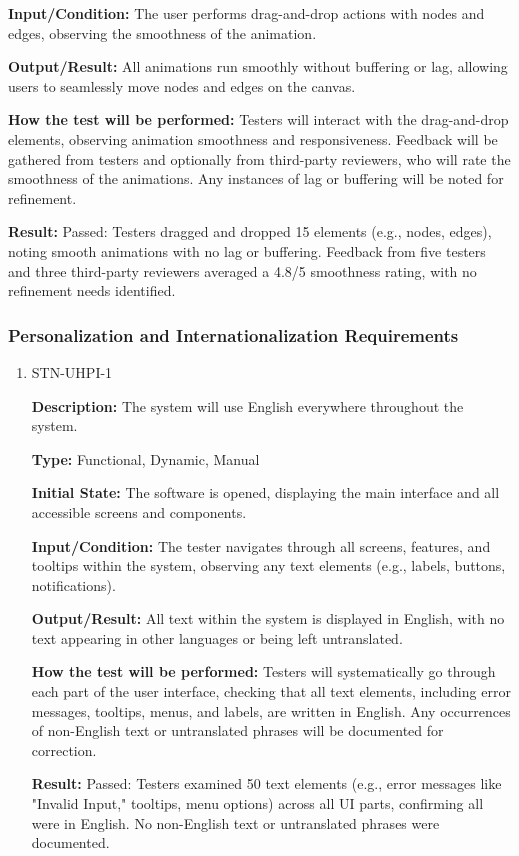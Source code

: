 \documentclass[12pt, titlepage]{article}
\begin{document}
\begin{enumerate}
\textbf{Input/Condition:} The user performs drag-and-drop actions with nodes and edges, observing the smoothness of the animation.

\textbf{Output/Result:} All animations run smoothly without buffering or lag, allowing users to seamlessly move nodes and edges on the canvas.

\textbf{How the test will be performed:} Testers will interact with the drag-and-drop elements, observing animation smoothness and responsiveness. Feedback will be gathered from testers and optionally from third-party reviewers, who will rate the smoothness of the animations. Any instances of lag or buffering will be noted for refinement.

\textbf{Result:} Passed: Testers dragged and dropped 15 elements (e.g., nodes, edges), noting smooth animations with no lag or buffering. Feedback from five testers and three third-party reviewers averaged a 4.8/5 smoothness rating, with no refinement needs identified.
\end{enumerate}

\subsubsection{Personalization and Internationalization Requirements}

\begin{enumerate}

\item{STN-UHPI-1\\}

\textbf{Description:} The system will use English everywhere throughout the system.

\textbf{Type:} Functional, Dynamic, Manual

\textbf{Initial State:} The software is opened, displaying the main interface and all accessible screens and components.

\textbf{Input/Condition:} The tester navigates through all screens, features, and tooltips within the system, observing any text elements (e.g., labels, buttons, notifications).

\textbf{Output/Result:} All text within the system is displayed in English, with no text appearing in other languages or being left untranslated.

\textbf{How the test will be performed:} Testers will systematically go through each part of the user interface, checking that all text elements, including error messages, tooltips, menus, and labels, are written in English. Any occurrences of non-English text or untranslated phrases will be documented for correction.

\textbf{Result:} Passed: Testers examined 50 text elements (e.g., error messages like "Invalid Input," tooltips, menu options) across all UI parts, confirming all were in English. No non-English text or untranslated phrases were documented.

\end{enumerate}
\end{document}
